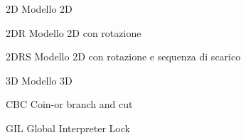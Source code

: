 
\begin{abbreviations}

\item[2D] Modello 2D
\item[2DR] Modello 2D con rotazione
\item[2DRS] Modello 2D con rotazione e sequenza di scarico
\item[3D] Modello 3D
\item[CBC] Coin-or branch and cut
\item[GIL] Global Interpreter Lock
\end{abbreviations}